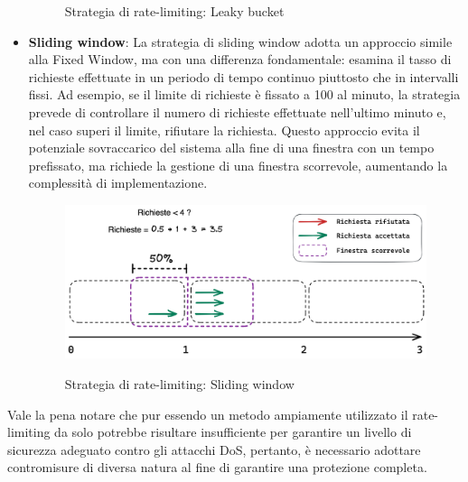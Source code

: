 \begin{itemize}
\begin{figure}[h]
        \label{fig:laky-bucket}
        \captionsetup{justification=centering}
        \caption{Strategia di rate-limiting: Leaky bucket}
    \end{figure}
    \item \textbf{Sliding window}: La strategia di sliding window adotta un approccio simile alla Fixed Window, ma con una differenza
    fondamentale: esamina il tasso di richieste effettuate in un periodo di tempo continuo piuttosto che in intervalli
    fissi. Ad esempio, se il limite di richieste è fissato a 100 al minuto, la strategia prevede di controllare il numero di
    richieste effettuate nell'ultimo minuto e, nel caso superi il limite, rifiutare la richiesta. Questo approccio evita il
    potenziale sovraccarico del sistema alla fine di una finestra con un tempo prefissato, ma richiede la gestione di una
    finestra scorrevole, aumentando la complessità di implementazione.
    \begin{figure}[h]
        \centering
        \includegraphics[width=13cm]{./chapters/1.state-of-art/images/4.sliding_window.png}
        \label{fig:sliding-window}
        \captionsetup{justification=centering}
        \caption{Strategia di rate-limiting: Sliding window}
    \end{figure}
\end{itemize}

Vale la pena notare che pur essendo un metodo ampiamente utilizzato il rate-limiting da solo potrebbe risultare
insufficiente per garantire un livello di sicurezza adeguato contro gli attacchi DoS, pertanto, è necessario adottare
contromisure di diversa natura al fine di garantire una protezione completa.